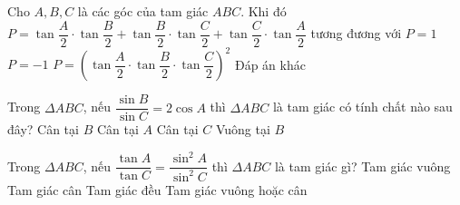 \begin{ex}%
Cho $A,B,C$ là các góc của tam giác $ABC$. 
Khi đó $P=\tan \dfrac{A}{2}\cdot\tan \dfrac{B}{2}+\tan \dfrac{B}{2}\cdot\tan \dfrac{C}{2}+\tan \dfrac{C}{2}\cdot\tan \dfrac{A}{2}$ tương đương với
\choice
{\True $P=1$}
{$P=-1$}
{$P=\left({\tan \dfrac{A}{2}\cdot\tan \dfrac{B}{2}\cdot\tan \dfrac{C}{2}}\right)^2$}
{Đáp án khác}
\end{ex}

\begin{ex}%
Trong $\Delta ABC$, nếu $\dfrac{{\sin B}}{{\sin C}}=2\cos A$ thì $\Delta ABC$ là tam giác có tính chất nào sau đây?
\choice
{\True Cân tại $B$}
{Cân tại $A$}
{Cân tại $C$}
{Vuông tại $B$}
\end{ex}

\begin{ex}%
Trong $\Delta ABC$, nếu $\dfrac{{\tan A}}{{\tan C}}=\dfrac{{{\sin}^2A}}{{{\sin}^2C}}$ thì $\Delta ABC$ là tam giác gì?
\choice
{Tam giác vuông}
{Tam giác cân}
{Tam giác đều}
{\True Tam giác vuông hoặc cân}
\end{ex}

